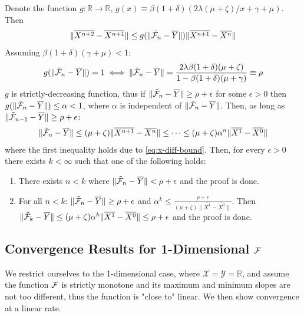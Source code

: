 \documentclass[nohyperref]{article}
\begin{document}
Denote the function  $g:\mathbb{R}\to\mathbb{R}$, $g(x)\equiv \beta(1+\delta) \left(2\lambda(\mu + \zeta)/x + \gamma + \mu \right)$. Then
\begin{align*}
    \| \overline{X^{n+2}} - \overline{X^{n+1}} \| \leq g(\| \Tilde{\mathcal{F}}_n - \overline{Y} \|) \| \overline{X^{n+1}} - \overline{X^n} \|
\end{align*}
Assuming $\beta(1+\delta)(\gamma+\mu)<1$:
\begin{align*}
    g(\| \Tilde{\mathcal{F}}_n - \overline{Y} \|) =1 \iff \| \Tilde{\mathcal{F}}_n - \overline{Y} \|=\frac{2\lambda\beta(1+\delta)(\mu + \zeta)}{1-\beta(1+\delta)(\mu+\gamma)}\equiv\rho
\end{align*}
$g$ is strictly-decreasing function, thus if $\| \Tilde{\mathcal{F}}_n - \overline{Y} \| \geq \rho +\epsilon$ for some $\epsilon>0$ then $g(\| \Tilde{\mathcal{F}}_n - \overline{Y} \|)\leq\alpha<1$, where $\alpha$ is independent of $\| \Tilde{\mathcal{F}}_n - \overline{Y} \|$. Then, as long as $\| \Tilde{\mathcal{F}}_{n-1} - \overline{Y} \| \geq \rho +\epsilon$:
\begin{align*}
    \| \Tilde{\mathcal{F}}_n - \overline{Y} \| \leq (\mu + \zeta)\| \overline{X^{n+1}} - \overline{X^n}\| \leq \dots \leq (\mu + \zeta)\alpha^n \| \overline{X^1}-\overline{X^0} \|
\end{align*}
where the first inequality holds due to \ref{eq:x-diff-bound}.
Then, for every $\epsilon>0$ there exists $k<\infty$ such that one of the following holds:
\begin{enumerate}
    \item There exists $n< k$ where $\| \Tilde{\mathcal{F}}_n - \overline{Y} \| < \rho +\epsilon$ and the proof is done.
    \item For all $n<k$: $\| \Tilde{\mathcal{F}}_n - \overline{Y} \| \geq \rho +\epsilon$ and $\alpha^k \leq \frac{\rho+\epsilon}{(\mu + \zeta)\| \overline{X^1}-\overline{X^0} \|}$. Then $\| \Tilde{\mathcal{F}}_k - \overline{Y} \| \leq (\mu + \zeta)\alpha^k \|\overline{X^1}-\overline{X^0} \| \leq \rho + \epsilon$ and the proof is done.
\end{enumerate}



\subsection{Convergence Results for 1-Dimensional $\mathcal{F}$}\label{app:1d-results}

We restrict ourselves to the 1-dimensional case, where $\mathcal{X}=\mathcal{Y}=\mathbb{R}$, and assume the function $\mathcal{F}$ is strictly monotone and its maximum and minimum slopes are not too different, thus the function is "close to" linear. We then show convergence at a linear rate.
\end{document}

